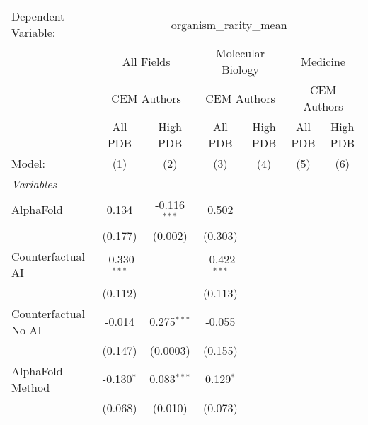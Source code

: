 \begingroup
\centering
\begin{tabular}{lcccccc}
   \tabularnewline \midrule \midrule
   Dependent Variable: & \multicolumn{6}{c}{organism\_rarity\_mean}\\
 & \multicolumn{2}{c}{All Fields} & \multicolumn{2}{c}{Molecular Biology} & \multicolumn{2}{c}{Medicine} \\
\cmidrule(lr){2-3} \cmidrule(lr){4-5} \cmidrule(lr){6-7}
 & \multicolumn{2}{c}{CEM Authors} & \multicolumn{2}{c}{CEM Authors} & \multicolumn{2}{c}{CEM Authors} \\
\cmidrule(lr){2-3} \cmidrule(lr){4-5} \cmidrule(lr){6-7}
 & \multicolumn{1}{c}{All PDB} & \multicolumn{1}{c}{High PDB} & \multicolumn{1}{c}{All PDB} & \multicolumn{1}{c}{High PDB} & \multicolumn{1}{c}{All PDB} & \multicolumn{1}{c}{High PDB} \\
\cmidrule(lr){2-2} \cmidrule(lr){3-3} \cmidrule(lr){4-4} \cmidrule(lr){5-5} \cmidrule(lr){6-6} \cmidrule(lr){7-7}
   Model:                                                     & (1)            & (2)            & (3)            & (4) & (5) & (6)\\  
   \midrule
   \emph{Variables}\\
   AlphaFold                                                  & 0.134          & -0.116$^{***}$ & 0.502          &     &     &   \\   
                                                              & (0.177)        & (0.002)        & (0.303)        &     &     &   \\   
   Counterfactual AI                                          & -0.330$^{***}$ &                & -0.422$^{***}$ &     &     &   \\   
                                                              & (0.112)        &                & (0.113)        &     &     &   \\   
   Counterfactual No AI                                       & -0.014         & 0.275$^{***}$  & -0.055         &     &     &   \\   
                                                              & (0.147)        & (0.0003)       & (0.155)        &     &     &   \\   
   AlphaFold - Method                                         & -0.130$^{*}$   & 0.083$^{***}$  & 0.129$^{*}$    &     &     &   \\   
                                                              & (0.068)        & (0.010)        & (0.073)        &     &     &   \\   

\end{tabular}
